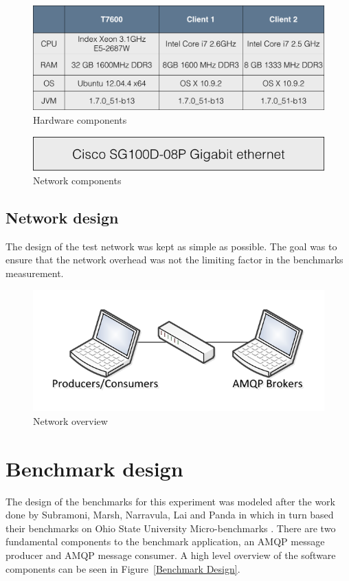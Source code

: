 \documentclass{thesis}
\begin{document}
\begin{figure}[h]
\centering
\label{hardware_components}
\includegraphics[scale=.40]{hardware_components}  
\caption{Hardware components}
\end{figure}

\begin{figure}[h]
\centering
\label{network_components}
\includegraphics[scale=.40]{network_hardware}  
\caption{Network components}
\end{figure}

\subsection{Network design}
The design of the test network was kept as simple as possible.  The goal was to ensure that the network overhead was not the limiting factor in the benchmarks measurement.

\begin{figure}[h]
\centering
\includegraphics{test_setup}  
\caption{Network overview}
\end{figure}

\section{Benchmark design}
The design of the benchmarks for this experiment was modeled after the work done by Subramoni, Marsh, Narravula, Lai and Panda in \cite{subramoni2008design} which in turn based their benchmarks on Ohio State University Micro-benchmarks \cite{OSU_MICRO_BENCHMARKS}.  There are two fundamental components to the benchmark application, an AMQP message producer and AMQP message consumer.  A high level overview of the software components can be seen in Figure~\ref{Benchmark Design}.  
\end{document}
